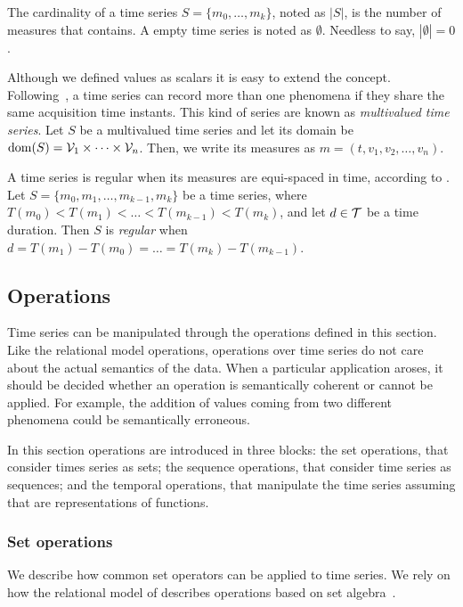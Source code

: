 The cardinality of a time series $S=\{m_0,\dots,m_k\}$, noted as
$|S|$, is the number of measures that contains.  A empty time series is
noted as $\emptyset$. Needless to say, $|\emptyset|=0$.

Although we defined values as scalars it is easy to extend the
concept. Following~\cite{assfalg08:thesis}, a time series can record
more than one phenomena if they share the same acquisition time
instants.  This kind of series are known as \emph{multivalued time
  series}. Let $S$ be a multivalued time series and let its domain be
$\operatorname{dom}(S)={\cal{V}}_1\times\cdots\times{\cal{V}}_n$. Then, we write its
measures as $m=(t,v_1,v_2,\ldots,v_n)$.



A time series is regular when its measures are equi-spaced in time,
according to \cite{last:hetland}.  Let $S=\{m_0, m_1,\ldots,
m_{k-1},m_k\}$ be a time series, where
$T(m_0)<T(m_1)<\dots<T(m_{k-1})<T(m_k)$, and let $d\in\cal{T}$ be a
time duration. Then $S$ is \emph{regular} when $d=T(m_1)-T(m_0)=
\dots =T(m_k)-T(m_{k-1})$.




\subsection{Operations}
\label{sec:model:operations}

Time series can be manipulated through the operations defined in this
section.
%
Like the relational model operations, operations over time series do
not care about the actual semantics of the data. When a particular
application aroses, it should be decided whether an operation is
semantically coherent or cannot be applied. For example, the addition
of values coming from two different phenomena could be semantically
erroneous.

In this section operations are introduced in three blocks: the set
operations, that consider times series as sets; the sequence
operations, that consider time series as sequences; and the temporal
operations, that manipulate the time series assuming that are
representations of functions. 



\subsubsection{Set operations}

We describe how common set operators can be applied to time series. We
rely on how the relational model of  describes operations
based on set algebra~\cite{date:introduction}.

